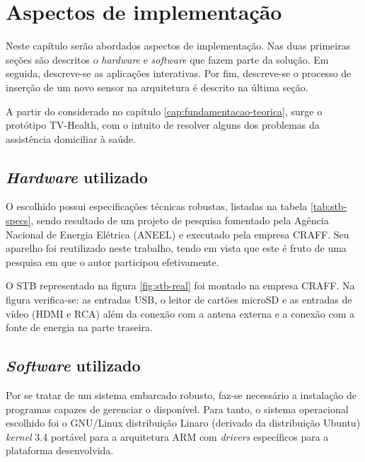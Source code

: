\chapter{Aspectos de implementação} \label{cap:aspectos-de-implementacao}

Neste capítulo serão abordados aspectos de implementação. Nas duas primeiras
seções são descritos o \textit{hardware} e \textit{software} que fazem parte da
solução. Em seguida, descreve-se as aplicações interativas. Por fim, descreve-se
o processo de inserção de um novo sensor na arquitetura é descrito na última seção.


A partir do considerado no capítulo \ref{cap:fundamentacao-teorica}, surge o
protótipo TV-Health, com o intuito de resolver alguns dos problemas da
assistência domiciliar à saúde.

\section{\textit{Hardware} utilizado} 

O \stb[] escolhido possui especificações técnicas robustas, listadas na 
tabela \ref{tab:stb-specs}, sendo resultado de um projeto de pesquisa
fomentado pela Agência Nacional de Energia Elétrica (ANEEL) e executado pela
empresa CRAFF. Seu aparelho foi reutilizado neste trabalho, tendo em vista
que este é fruto de uma pesquisa em que o autor participou efetivamente.


O STB representado na figura \vref{fig:stb-real} foi montado na empresa
CRAFF. Na figura verifica-se: as entradas USB, o leitor de cartões
microSD e as entradas de vídeo (HDMI e RCA) além da 
conexão com a antena externa e a conexão com a fonte de energia na
parte traseira.

\section{\textit{Software} utilizado}

Por se tratar de um sistema embarcado robusto, faz-se necessário a instalação
de programas capazes de gerenciar o \hardware[] disponível. Para tanto, o
sistema operacional escolhido foi o GNU/Linux distribuição Linaro (derivado da
distribuição Ubuntu) \textit{kernel} 3.4 portável para a arquitetura 
ARM com \textit{drivers} específicos para a plataforma desenvolvida.

